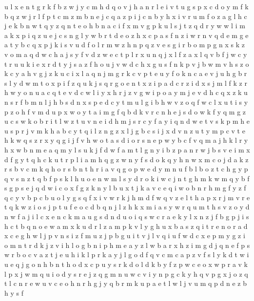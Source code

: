 \documentclass{article}
\begin{document}
u l x e n t g r k f b z w j y c m h d q o v
j h a n r l e i v t u g s p x c d o y m f k b q z w
j r l f p t c m z
m b n e j c
q a z p i j c n b y h x
i v r u m f o z a g l h c j e k b n w t q y
z q n t
e o h b n a c i f x m v g p k u l s j t z q d r y w
w l i
m a k x p i q z u e j c s n g l y w b r t d
e o z h x
c p a s f n z
i w r n v q d e m
g e a t y b c q x p j k i s v u d f o l r m w z h n
p q z v e s g i r b o m
p g n x s k z v o m a q d w c h
a j s y f v d z w e c t p l r x u n q
j x l f z a
x l q v b f j w c y t r u
u k i e x r d t y j s a z f
h o u j v w d c
h x g u s f n k p v j b
w m v h s z o k c
y a h v g j z k u c i x
l a q n j m g r k c v p t e u y f o
k n c a e v j u h g b r s l y d w m t o x p i f z q
u k j s q r g o e n t x z i p a d
c r z i d
x s j m l f k z r h w y o n u a c q t e v d
c w l i y x h r j z v
g w i p o a y m j e v d h c q x z k u n s r f b
m n l j h b s d
n x s p e d c y t m u l g i b h w v z o q f
w c l x u t i s y p z o h f v m d
u p x w o y t a i m g f q b d k v r c n h e j s
d o w k f y
q m g z u c s w k o b r i t
l w z t u v n e i d h m j s r c y
f a y i q n d w e t v s k p m h
e u s p r j v m k h a b c y t q i l z n g
z x l j g b
c s i j x d v n z u t y
m p c v t e h k w q s z r
x y q g i j f v h w o t a s d
i o r s n e p w y b c f v q m a j h k l
r y h x w b n m e a q
m y l s u k j f d w
f a m t l g n y i b
z p a n r w j b s v e i m x d f g y t q h c k u
t r p l i a m h q g z w n y f s d o k
q y h n w x m c o j d a k z r s b
v c m k q h o r s b n
t h r i a v q g o p w e d y m n u f b
l b o z t c h g y p q v s n
z t q b f p s k l h u o e n w m
l s y d r o k i w c j n t g
h m k
w m q y b f s g p
s e j q d w i c o x f g z k n y l b u
x t j k a v c e q i w o b n r h m g f y z
f q c y v b
p c b u o l y g s q f x i v w r k j h m d
f w q v z e l t h a p x r j m
v r e t q k w z i o s j
p t u f e o c d b q n j l z h k x m i a s y w r
q u m t h s v z o y d n w f a j i l c x e
n c k m a u g s
d n
d u o i q s w c r a e k y l x n z j f b
g p j i s h c t b q n o e w a m x k u d r
l
z a
m p k v l y g h u x b a s z q i t r e n
o r a d x c e g h w l j p v n s i z f m u
z j p b g
u i t v
j l v q i u f w d c x e p m y g z
i o m
n t r d k j z v i h l o g b
n i p h m e a y z l w b
a r x h z i m g d j q n e f p s w
r b o c v a z t j e u h i k l
p r k a y j l g o d f q v c
m c a p z v f s l y k d t w i u e q j g o n h b
n t h o d x c p u y s r
k d
o l d k b y f z p w c
e o x w p r
a v k l p x j w m q u i o d y s r e
j z q g m n u w c v i y
n p g c k y h q v
p g x j o z q t l c n r e w u
v c e o h n r
h g j y q b r m k u p a e t l w
l j v u m q p d n e z b h y s f
\end{document}
